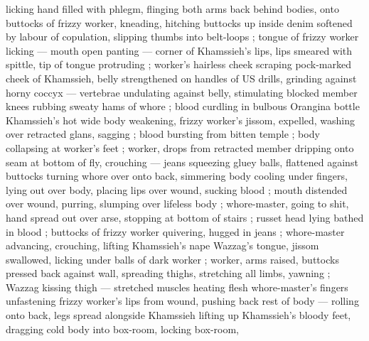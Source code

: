 licking hand filled with phlegm, flinging both arms back behind bodies, onto buttocks of frizzy worker, kneading, hitching buttocks up inside denim softened by labour of copulation, slipping thumbs into belt-loops ; tongue of frizzy worker licking --- mouth open panting --- corner of Khamssieh's lips, lips smeared with spittle, tip of tongue protruding ; worker's hairless cheek scraping pock-marked cheek of Khamssieh, belly strengthened on handles of US drills, grinding against horny coccyx --- vertebrae undulating against belly, stimulating blocked member {\dashcom} knees rubbing sweaty hams of whore ; blood curdling in bulbous Orangina bottle {\col} Khamssieh's hot wide body weakening, frizzy worker's jissom, expelled, washing over retracted glans, sagging ; blood bursting from bitten temple ; body collapsing at worker's feet ; worker, drops from retracted member dripping onto seam at bottom of fly, crouching --- jeans squeezing gluey balls, flattened against buttocks {\dashcom} turning whore over onto back, simmering body cooling under fingers, lying out over body, placing lips over wound, sucking blood  ; mouth distended over wound, purring, slumping over lifeless body{\td}  ; whore-master, going to shit, hand spread out over arse, stopping at bottom of stairs ; russet head lying bathed in blood ; buttocks of frizzy worker quivering, hugged in jeans ; whore-master advancing, crouching, lifting Khamssieh's nape{\td} {\semislash} Wazzag's tongue, jissom swallowed, licking under balls of dark worker ; worker, arms raised, buttocks pressed back against wall, spreading thighs, stretching all limbs, yawning ; Wazzag kissing thigh --- stretched muscles heating flesh {\semislash} whore-master's fingers unfastening frizzy worker's lips from wound, pushing back rest of body --- rolling onto back, legs spread alongside Khamssieh {\dashcom} lifting up Khamssieh's bloody feet, dragging cold body into box-room, locking box-room, 
